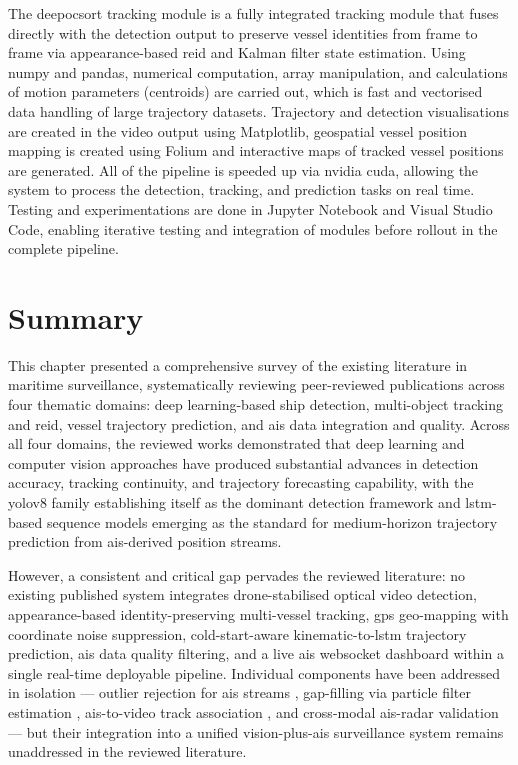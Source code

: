 The \gls{deepocsort} tracking module is a fully integrated tracking module that fuses directly with the detection output to preserve vessel identities from frame to frame via appearance-based \gls{reid} and Kalman filter state estimation. Using \gls{numpy} and \gls{pandas}, numerical computation, array manipulation, and calculations of motion parameters (centroids) are carried out, which is fast and vectorised data handling of large trajectory datasets. Trajectory and detection visualisations are created in the video output using Matplotlib, geospatial vessel position mapping is created using Folium and interactive maps of tracked vessel positions are generated. All of the pipeline is speeded up via \gls{nvidia} \gls{cuda}, allowing the system to process the detection, tracking, and prediction tasks on real time. Testing and experimentations are done in Jupyter Notebook and Visual Studio Code, enabling iterative testing and integration of modules before rollout in the complete pipeline.


\section{Summary}

This chapter presented a comprehensive survey of the existing literature in
maritime surveillance, systematically reviewing peer-reviewed publications across
four thematic domains: deep learning-based ship detection, multi-object tracking
and \gls{reid}, vessel trajectory prediction, and \gls{ais} data integration and quality. Across all four domains,
the reviewed works demonstrated that deep learning and computer vision approaches
have produced substantial advances in detection accuracy, tracking continuity, and
trajectory forecasting capability, with the \gls{yolov8} family establishing itself as
the dominant detection framework and \gls{lstm}-based sequence models emerging as the
standard for medium-horizon trajectory prediction from \gls{ais}-derived position streams.

However, a consistent and critical gap pervades the reviewed literature: no
existing published system integrates drone-stabilised optical video detection,
appearance-based identity-preserving multi-vessel tracking, \gls{gps} geo-mapping with
coordinate noise suppression, cold-start-aware kinematic-to-\gls{lstm} trajectory
prediction, \gls{ais} data quality filtering, and a live \gls{ais} \gls{websocket} dashboard within
a single real-time deployable pipeline. Individual components have been addressed
in isolation --- outlier rejection for \gls{ais} streams \cite{Urakami2018, Wang2024a},
gap-filling via particle filter estimation \cite{Lian2019}, \gls{ais}-to-video track
association \cite{Chen2023a}, and cross-modal \gls{ais}-radar validation
\cite{Gurgel2010} --- but their integration into a unified vision-plus-\gls{ais}
surveillance system remains unaddressed in the reviewed literature.

